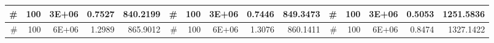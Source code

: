 \begin{table}[htbp]
\begin{tabular}{|r|r|r|r|r|r|r|r|r|r|r|r|r|r|r|}
		\midrule
		\#                                & 100                             & 3E+06                           & 0.7527                             & 840.2199                             & \#                               & 100                             & 3E+06                           & 0.7446                             & 849.3473                             & \# & 100      & 3E+06 & 0.5053 & 1251.5836 \\
		\midrule
		\#                                & 100                             & 6E+06                           & 1.2989                             & 865.9012                             & \#                               & 100                             & 6E+06                           & 1.3076                             & 860.1411                             & \# & 100      & 6E+06 & 0.8474 & 1327.1422 \\
		\bottomrule
	\end{tabular}%
	\label{tab:addlabel}%
\end{table}%